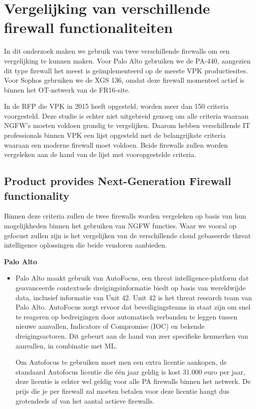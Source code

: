 \section{Vergelijking van verschillende firewall functionaliteiten}
In dit onderzoek maken we gebruik van twee verschillende firewalls om een vergelijking te kunnen maken. Voor Palo Alto gebruiken we de PA-440, aangezien dit type firewall het meest is geïmplementeerd op de meeste VPK productiesites. Voor Sophos gebruiken we de XGS 136, omdat deze firewall momenteel actief is binnen het OT-netwerk van de FR16-site.

\vspace{5mm}
In de RFP die VPK in 2015 heeft opgesteld, worden meer dan 150 criteria voorgesteld. Deze studie is echter niet uitgebreid genoeg om alle criteria waaraan NGFW’s moeten voldoen grondig te vergelijken. Daarom hebben verschillende IT professionals binnen VPK een lijst opgesteld met de belangrijkste criteria waaraan een moderne firewall moet voldoen. Beide firewalls zullen worden vergeleken aan de hand van de lijst met vooropgestelde criteria.




\subsection{Product provides Next-Generation Firewall functionality}

Binnen deze criteria zullen de twee firewalls worden vergeleken op basis van hun mogelijkheden binnen het gebruiken van NGFW functies. Waar we vooral op gefocust zullen zijn is het vergelijken van de verschillende cloud gebaseerde threat intelligence oplossingen die beide vendoren aanbieden.


\textbf{Palo Alto}
\begin{itemize}[label=\textbullet]
    \item Palo Alto maakt gebruik van AutoFocus, een threat intelligence-platform dat geavanceerde contextuele dreigingsinformatie biedt op basis van wereldwijde data, inclusief informatie van Unit 42. Unit 42 is het threat research team van Palo Alto. AutoFocus zorgt ervoor dat beveiligingsteams in staat zijn om snel te reageren op bedreigingen door automatisch verbanden te leggen tussen nieuwe aanvallen, Indicators of Compromise (IOC) en bekende dreigingsactoren. Dit gebeurt aan de hand van zeer specifieke kenmerken van aanvallen, in combinatie met ML.\autocite{PaloAltoAF2025}
    
    Om Autofocus te gebruiken moet men een extra licentie aankopen, de standaard Autofocus licentie die één jaar geldig is kost 31.000 euro per jaar, deze licentie is echter wel geldig voor alle PA firewalls binnen het netwerk. De prijs die je per firewall zal moeten betalen voor deze licentie hangt dus grotendeels af van het aantal actieve firewalls.
\end{itemize}

